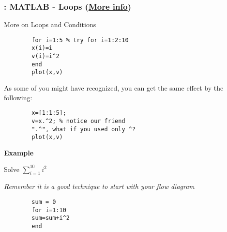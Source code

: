 \documentclass[11pt]{beamer}
\begin{document}
\begin{frame}[fragile]
	
	\frametitle{\secname: MATLAB - Loops 
		(\href{http://www.mathworks.com/help/matlab/matlab_prog/loop-control-statements.html}{More info})}
	\begin{block}{}
		More on Loops and Conditions
	\end{block}
	
	\begin{minipage}[t]{0.55\linewidth}
		\begin{verbatim}
		for i=1:5 % try for i=1:2:10
		x(i)=i
		v(i)=i^2
		end
		plot(x,v)
		\end{verbatim}
		As some of you might have recognized, you can get the same effect by the following:
		\begin{verbatim}
		x=[1:1:5];
		v=x.^2; % notice our friend
		".^", what if you used only ^?
		plot(x,v)
		\end{verbatim}
	\end{minipage}\hspace{7pt}
	\begin{minipage}[t]{0.42\linewidth}
		\textbf{Example}\\
		\begin{center}
			Solve $\sum_{i=1}^{10}i^2$
		\end{center}
		
		\begin{block}{}
		\textit{Remember it is a good technique to start with your flow diagram}
		\end{block}
		
		\begin{verbatim}
		sum = 0
		for i=1:10
		sum=sum+i^2
		end	
		\end{verbatim}
		
		
	\end{minipage}
	
	
\end{frame}
\end{document}
